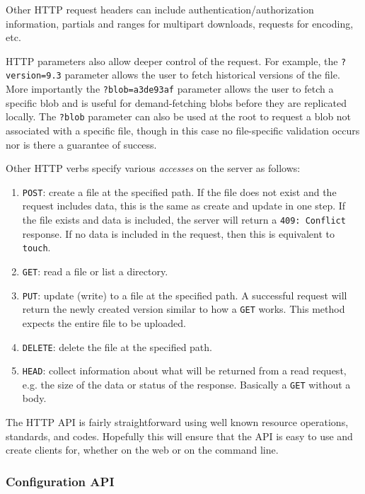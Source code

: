\documentclass[letterpaper,twocolumn,10pt]{article}
\begin{document}
Other HTTP request headers can include authentication/authorization
information, partials and ranges for multipart downloads, requests for
encoding, etc.

HTTP parameters also allow deeper control of the request.
For example, the \texttt{?version=9.3} parameter allows the user to fetch
historical versions of the file.
More importantly the \texttt{?blob=a3de93af} parameter allows the user to
fetch a specific blob and is useful for demand-fetching blobs before they
are replicated locally.
The \texttt{?blob} parameter can also be used at the root to request a blob
not associated with a specific file, though in this case no file-specific
validation occurs nor is there a guarantee of success.

Other HTTP verbs specify various \textit{accesses} on the server as follows:

\begin{enumerate}
    \item \texttt{POST}: create a file at the specified path. If the file
    does not exist and the request includes data, this is the same as create
    and update in one step. If the file exists and data is included, the
    server will return a \texttt{409: Conflict} response. If no data is
    included in the request, then this is equivalent to \texttt{touch}.
    \item \texttt{GET}: read a file or list a directory.
    \item \texttt{PUT}: update (write) to a file at the specified path. A
    successful request will return the newly created version similar to how a
    \texttt{GET} works. This method expects the entire file to be uploaded.
    \item \texttt{DELETE}: delete the file at the specified path.
    \item \texttt{HEAD}: collect information about what will be returned from
    a read request, e.g. the size of the data or status of the response.
    Basically a \texttt{GET} without a body.
\end{enumerate}

The HTTP API is fairly straightforward using well known resource operations,
standards, and codes.
Hopefully this will ensure that the API is easy to use and create clients
for, whether on the web or on the command line.

\subsubsection*{Configuration API}
\end{document}
